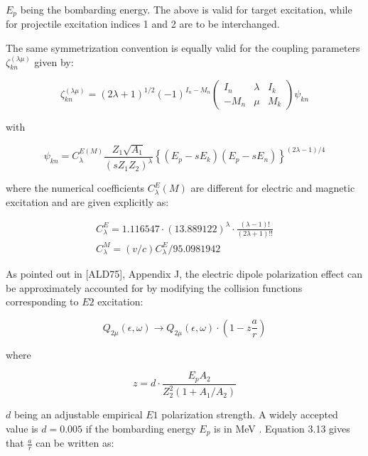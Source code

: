 \documentclass[10pt]{article}
\begin{document}
$E_{p}$ being the bombarding energy. The above is valid for target excitation, while for projectile excitation indices 1 and 2 are to be interchanged.

The same symmetrization convention is equally valid for the coupling parameters $\zeta_{k n}^{(\lambda \mu)}$ given by:

\[
\zeta_{k n}^{(\lambda \mu)}=(2 \lambda+1)^{1 / 2}(-1)^{I_{n}-M_{n}}\left(\begin{array}{ccc}
I_{n} & \lambda & I_{k}  \tag{3.23}\\
-M_{n} & \mu & M_{k}
\end{array}\right) \psi_{k n}
\]

with


\begin{equation*}
\psi_{k n}=C_{\lambda}^{E(M)} \frac{Z_{1} \sqrt{A_{1}}}{\left(s Z_{1} Z_{2}\right)^{\lambda}}\left\{\left(E_{p}-s E_{k}\right)\left(E_{p}-s E_{n}\right)\right\}^{(2 \lambda-1) / 4} \tag{3.24}
\end{equation*}


where the numerical coefficients $C_{\lambda}^{E}(M)$ are different for electric and magnetic excitation and are given explicitly as:


\begin{gather*}
C_{\lambda}^{E}=1.116547 \cdot(13.889122)^{\lambda} \cdot \frac{(\lambda-1)!}{(2 \lambda+1)!!}  \tag{3.25}\\
C_{\lambda}^{M}=(v / c) C_{\lambda}^{E} / 95.0981942 \tag{3.26}
\end{gather*}


As pointed out in [ALD75], Appendix J, the electric dipole polarization effect can be approximately accounted for by modifying the collision functions corresponding to $E 2$ excitation:


\begin{equation*}
Q_{2 \mu}(\epsilon, \omega) \longrightarrow Q_{2 \mu}(\epsilon, \omega) \cdot\left(1-z \frac{a}{r}\right) \tag{3.27}
\end{equation*}


where


\begin{equation*}
z=d \cdot \frac{E_{p} A_{2}}{Z_{2}^{2}\left(1+A_{1} / A_{2}\right)} \tag{3.28}
\end{equation*}


$d$ being an adjustable empirical $E 1$ polarization strength. A widely accepted value is $d=0.005$ if the bombarding energy $E_{p}$ is in MeV . Equation 3.13 gives that $\frac{a}{r}$ can be written as:
\end{document}
